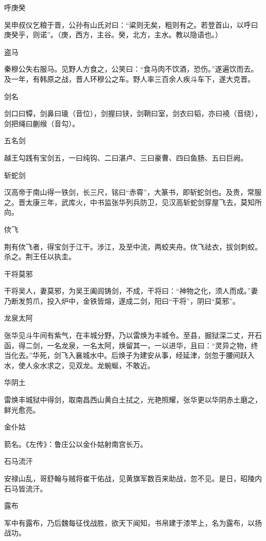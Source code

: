 \documentclass[a4paper,12pt,UTF8,twoside]{ctexbook}
\begin{document}
    呼庚癸
    
    吴申叔仪乞粮于晋，公孙有山氏对曰：“粱则无矣，粗则有之。若登首山，以呼曰庚癸乎，则诺”。（庚，西方，主谷。癸，北方，主水。教以隐语也。）
    
    盗马
    
    秦穆公失右服马。见野人方食之，公笑曰：“食马肉不饮酒，恐伤。”遂遍饮而去。及一年，有韩原之战，晋人环穆公之车。野人率三百余人疾斗车下，遂大克晋。
    
    剑名
    
    剑口曰镡，剑鼻曰璏（音位），剑握曰铗，剑鞘曰室，剑衣曰韬，亦曰襓（音绕），剑把绳曰蒯缑（音勾）。
    
    五名剑
    
    越王勾践有宝剑五，一曰纯钩、二曰湛卢、三曰豪曹、四曰鱼肠、五曰巨阙。
    
    斩蛇剑
    
    汉高帝于南山得一铁剑，长三尺，铭曰“赤霄”，大篆书，即斩蛇剑也。及贵，常服之。晋太康三年，武库火，中书监张华列兵防卫，见汉高斩蛇剑穿屋飞去，莫知所向。
    
    佽飞
    
    荆有佽飞者，得宝剑于江干。涉江，及至中流，两蛟夹舟。佽飞祛衣，拔剑刺蛟。杀之。荆王任以执圭。
    
    干将莫邪
    
    干将吴人，妻莫邪，为吴王阖闾铸剑，不成，干将曰：“神物之化，须人而成。”妻乃断发剪爪，投入炉中，金铁皆熔，遂成二剑，阳曰“干将”，阴曰“莫邪”。
    
    龙泉太阿
    
    张华见斗牛间有紫气，在丰城分野，乃以雷焕为丰城令。至县，掘狱深二丈，开石函，得二剑，一名龙泉，一名太阿，焕留其一，一以进华，且曰：“灵异之物，终当化去。”华死，剑飞入襄城水中。后焕子为建安从事，经延津，剑忽于腰间跃入水，使人汆水求之，见双龙。龙蜿蜒，不敢近。
    
    华阴土
    
    雷焕丰城狱中得剑，取南昌西山黄白土拭之，光艳照耀，张华更以华阴赤土磨之，鲜光愈亮。
    
    金仆姑
    
    箭名。《左传》：鲁庄公以金仆姑射南宫长万。
    
    石马流汗
    
    安禄山乱，哥舒翰与贼将崔干佑战，见黄旗军数百来助战，忽不见。是日，昭陵内石马皆流汗。
    
    露布
    
    军中有露布，乃后魏每征伐战胜，欲天下闻知，书帛建于漆竿上，名为露布，以扬战功。
    
\end{document}
